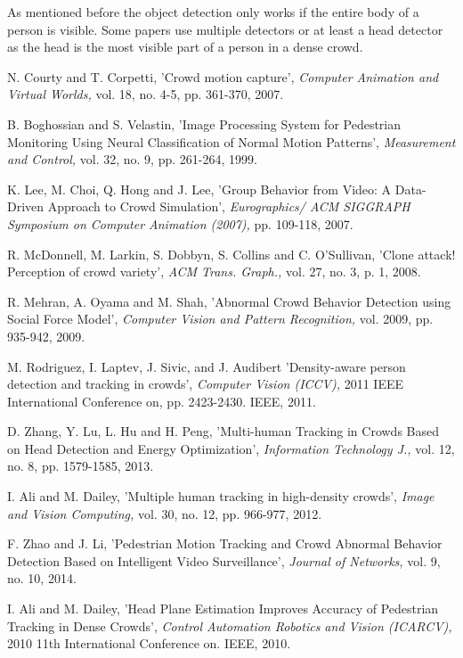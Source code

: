 \documentclass[12pt, onecolumn, conference]{IEEEtran}
\begin{document}
As mentioned before the object detection only works if the entire body of a person is visible. Some papers use multiple detectors or at least a head detector as the head is the most visible part of a person in a dense crowd.

\begin{thebibliography}{1}

N. Courty and T. Corpetti, 'Crowd motion capture', \textit{Computer Animation and Virtual Worlds,} vol. 18, no. 4-5, pp. 361-370, 2007.

B. Boghossian and S. Velastin, 'Image Processing System for Pedestrian Monitoring Using Neural Classification of Normal Motion Patterns', \textit{Measurement and Control,} vol. 32, no. 9, pp. 261-264, 1999.

K. Lee, M. Choi, Q. Hong and J. Lee, 'Group Behavior from Video: A Data-Driven Approach to Crowd Simulation', \textit{Eurographics/ ACM SIGGRAPH Symposium on Computer Animation (2007),} pp. 109-118, 2007.

R. McDonnell, M. Larkin, S. Dobbyn, S. Collins and C. O'Sullivan, 'Clone attack! Perception of crowd variety', \textit{ACM Trans. Graph.,} vol. 27, no. 3, p. 1, 2008.

R. Mehran, A. Oyama and M. Shah, 'Abnormal Crowd Behavior Detection using Social Force Model', \textit{Computer Vision and Pattern Recognition,} vol. 2009, pp. 935-942, 2009.

M. Rodriguez, I. Laptev, J. Sivic, and J. Audibert 'Density-aware person detection and tracking in crowds', \textit{Computer Vision (ICCV),} 2011 IEEE International Conference on, pp. 2423-2430. IEEE, 2011.

D. Zhang, Y. Lu, L. Hu and H. Peng, 'Multi-human Tracking in Crowds Based on Head Detection and Energy Optimization', \textit{Information Technology J.,} vol. 12, no. 8, pp. 1579-1585, 2013.

I. Ali and M. Dailey, 'Multiple human tracking in high-density crowds', \textit{Image and Vision Computing,} vol. 30, no. 12, pp. 966-977, 2012.

F. Zhao and J. Li, 'Pedestrian Motion Tracking and Crowd Abnormal Behavior Detection Based on Intelligent Video Surveillance', \textit{Journal of Networks,} vol. 9, no. 10, 2014.

I. Ali and M. Dailey, 'Head Plane Estimation Improves Accuracy of Pedestrian Tracking in Dense Crowds', \textit{Control Automation Robotics and Vision (ICARCV),} 2010 11th International Conference on. IEEE, 2010.


\end{thebibliography}
\end{document}

